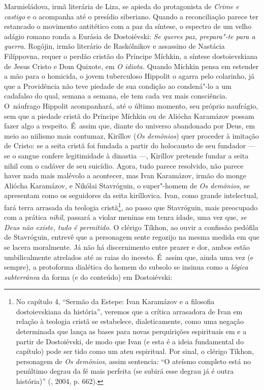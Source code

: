 Marmieládova, irmã literária de Liza, se apieda do protagonista de
\emph{Crime e castigo} e o acompanha até o presídio siberiano. Quando a
reconciliação parece ter estancado o movimento antitético com a paz da
síntese, o espectro de um velho adágio romano ronda a Eurásia de
Dostoiévski: \emph{Se queres paz, prepara"-te para a guerra.} Rogójin,
irmão literário de Raskólnikov e assassino de Nastácia Filíppovna,
requer o perdão cristão do Príncipe Míchkin, a síntese dostoievskiana de
Jesus Cristo e Dom Quixote, em \emph{O idiota.} Quando Míchkin pensa em
estender a mão para o homicida, o jovem tuberculoso Hippolit o agarra
pelo colarinho, já que a Providência não teve piedade de sua condição ao
condená"-lo a um cadafalso do qual, semana a semana, ele tem cada vez
mais consciência. O~náufrago Hippolit acompanhará, até o último momento,
seu próprio naufrágio, sem que a piedade cristã do Príncipe Míchkin ou
de Aliócha Karamázov possam fazer algo a respeito. É~assim que, diante
do universo abandonado por Deus, em meio ao niilismo mais contumaz,
Kiríllov (\emph{Os demônios}) quer proceder à imitação de Cristo: se a
seita cristã foi fundada a partir do holocausto de seu fundador --- se o
sangue confere legitimidade à dinastia ---, Kiríllov pretende fundar a
seita nihil com o cadáver de seu suicídio. Agora, tudo parece resolvido,
não parece haver nada mais malévolo a acontecer, mas Ivan Karamázov,
irmão do monge Aliócha Karamázov, e Nikólai Stavróguin, o super"-homem de
\emph{Os demônios}, se apresentam como os seguidores da seita
kiríllovica. Ivan, como grande intelectual, fará terra arrasada da
teologia cristã\footnote{No capítulo 4, ``Sermão da Estepe: Ivan
  Karamázov e a filosofia dostoievskiana da história'', veremos que a
  crítica arrasadora de Ivan em relação à teologia cristã se estabelece,
  dialeticamente, como uma negação determinada que lança as bases para
  novas perquirições espirituais em e a partir de Dostoiévski, de modo
  que Ivan (e esta é a ideia fundamental do capítulo) pode ser tido como
  um ateu espiritual. Por sinal, o clérigo Tíkhon, personagem de
  \emph{Os demônios}, assim sentencia: ``O ateísmo completo está no
  penúltimo degrau da fé mais perfeita (se subirá esse degrau já é outra
  história)'' (, 2004, p. 662).}, ao passo que Stavróguin,
mais preocupado com a prática \emph{nihil}, passará a violar meninas em
tenra idade, uma vez que, \emph{se Deus não existe, tudo é permitido.} O
clérigo Tíkhon, ao ouvir a confissão pedófila de Stavróguin, entrevê que
a personagem sente regozijo na mesma medida em que se lacera moralmente.
Já não há discernimento entre prazer e dor, ambos estão umbilicalmente
atrelados até as raias do incesto. É~assim que, ainda uma vez (e
sempre), a protoforma dialética do homem do subsolo se insinua como a
\emph{lógica subterrânea} da forma (e do conteúdo) em Dostoiévski:

